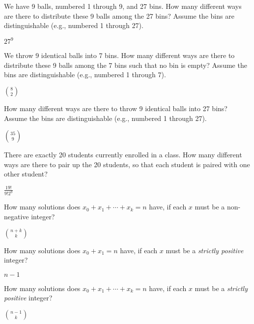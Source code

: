 \documentclass[11pt]{article}
\begin{document}
\begin{Parts}
\begin{enumerate}[(i)]
    \end{enumerate}

    \Part We have 9 balls, numbered 1 through 9, and 27 bins. How many different ways are there to distribute these 9 balls among
    the 27 bins? Assume the bins are distinguishable (e.g., numbered 1 through 27).
    \begin{Answer}
        $27^9$
    \end{Answer}
    
    \newpage
    \Part We throw 9 identical balls into 7 bins. How many different ways are there to distribute these 9 balls among
    the 7 bins such that no bin is empty? Assume the bins are distinguishable (e.g., numbered 1 through 7).
    \begin{Answer}
        ${8 \choose 2}$
    \end{Answer}
    
    \Part How many different ways are there to throw 9 identical balls into 27 bins? Assume the bins are distinguishable (e.g., numbered 1
    through 27).
    \begin{Answer}
        ${35 \choose 9}$
    \end{Answer}
    
    \Part There are exactly 20 students currently enrolled in a class. How many different ways are there to pair up the 20 students, so
    that each student is paired with one other student?
    \begin{Answer}
        ${\frac{19!}{9!2^9}}$
    \end{Answer}
    
    \Part How many solutions does $x_0 + x_1 + \cdots + x_k = n$ have, if each $x$ must be a non-negative integer?
    \begin{Answer}
        ${n+k \choose k}$
    \end{Answer}

    \Part How many solutions does $x_0 + x_1 = n$ have, if each $x$ must be a \emph{strictly positive} integer?
    \begin{Answer}
        $n-1$
    \end{Answer}
    
    \Part How many solutions does $x_0 + x_1 + \cdots + x_k = n$ have, if each $x$ must be a \emph{strictly positive} integer?
    \begin{Answer}
        $n - 1 \choose k$
    \end{Answer}

\end{Parts}
\end{document}
